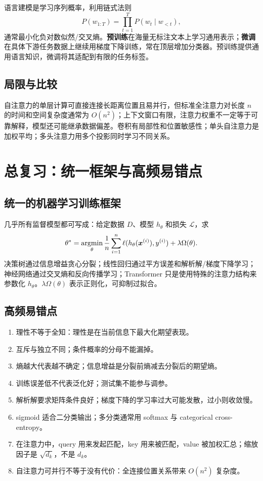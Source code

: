\documentclass[UTF8,11pt,a4paper]{ctexart}
\newcommand{\loss}{\mathcal{L}}\newcommand{\softmax}{\operatorname{softmax}}\newcommand{\sigmoid}{\operatorname{sigmoid}}
\begin{document}
语言建模是学习序列概率，利用链式法则
\[
P(w_{1:T})=\prod_{t=1}^{T}P(w_t\mid w_{<t}),
\]
通常最小化负对数似然/交叉熵。\textbf{预训练}在海量无标注文本上学习通用表示；\textbf{微调}在具体下游任务数据上继续用梯度下降训练，常在顶层增加分类器。预训练提供通用语言知识，微调将其适配到有限的任务标签。

\subsection{局限与比较}
自注意力的单层计算可直接连接长距离位置且易并行，但标准全注意力对长度 $n$ 的时间和空间复杂度通常为 $O(n^2)$；上下文窗口有限，注意力权重不一定等于可靠解释，模型还可能继承数据偏差。卷积有局部性和位置敏感性；单头自注意力是加权平均；多头注意力用多个投影同时学习不同关系。

\section{总复习：统一框架与高频易错点}
\subsection{统一的机器学习训练框架}
几乎所有监督模型都可写成：给定数据 $D$、模型 $h_\theta$ 和损失 $\loss$，求
\[
\theta^*=\mathop{\mathrm{argmin}}_\theta\frac1n\sum_{i=1}^{n}\ell(h_\theta(\bm x^{(i)}),y^{(i)})+\lambda\Omega(\theta).
\]
决策树通过信息增益贪心分裂；线性回归通过平方误差和解析解/梯度下降学习；神经网络通过交叉熵和反向传播学习；Transformer 只是使用特殊的注意力结构来参数化 $h_\theta$。$\lambda\Omega(\theta)$ 表示正则化，可抑制过拟合。

\subsection{高频易错点}
\begin{enumerate}
\item 理性不等于全知：理性是在当前信息下最大化期望表现。
\item 互斥与独立不同；条件概率的分母不能漏掉。
\item 熵越大代表越不确定；信息增益是分裂前熵减去分裂后的期望熵。
\item 训练误差低不代表泛化好；测试集不能参与调参。
\item 解析解要求矩阵条件良好；梯度下降的学习率过大可能发散，过小则收敛慢。
\item sigmoid 适合二分类输出；多分类通常用 softmax 与 categorical cross-entropy。
\item 在注意力中，query 用来发起匹配，key 用来被匹配，value 被加权汇总；缩放因子是 $\sqrt{d_k}$，不是 $d_k$。
\item 自注意力可并行不等于没有代价：全连接位置关系带来 $O(n^2)$ 复杂度。
\end{enumerate}
\end{document}
